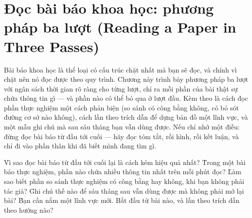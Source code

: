 \documentclass[../../english.tex]{subfiles}
\begin{document}
\chapter{Đọc bài báo khoa học: phương pháp ba lượt (Reading a Paper in Three Passes)}

\begin{tomtat}
Bài báo khoa học là thể loại có cấu trúc chặt nhất mà bạn sẽ đọc, và chính vì chặt nên nó đọc được theo quy trình. Chương này trình bày phương pháp ba lượt với ngân sách thời gian rõ ràng cho từng lượt, chỉ ra mỗi phần của bài thật sự chứa thông tin gì --- và phần nào có thể bỏ qua ở lượt đầu. Kèm theo là cách đọc phần thực nghiệm một cách phản biện (so sánh có công bằng không, có bỏ sót đường cơ sở nào không), cách lần theo trích dẫn để dựng bản đồ một lĩnh vực, và một mẫu ghi chú mà sau sáu tháng bạn vẫn dùng được. Nếu chỉ nhớ một điều: đừng đọc bài báo từ đầu tới cuối --- hãy đọc tóm tắt, rồi hình, rồi kết luận, và chỉ đi vào phần thân khi đã biết mình đang tìm gì.
\end{tomtat}

\begin{nentang}
\end{nentang}

\begin{khoigoi}
\h{Vì sao đọc bài báo từ đầu tới cuối lại là cách kém hiệu quả nhất?}
\h{Trong một bài báo thực nghiệm, phần nào chứa nhiều thông tin nhất trên mỗi phút đọc?}
\h{Làm sao biết phần so sánh thực nghiệm có công bằng hay không, khi bạn không phải tác giả?}
\h{Ghi chú thế nào để sáu tháng sau vẫn dùng được mà không phải mở lại bài?}
\h{Bạn cần nắm một lĩnh vực mới. Bắt đầu từ bài nào, và lần theo trích dẫn theo hướng nào?}
\end{khoigoi}
\end{document}
